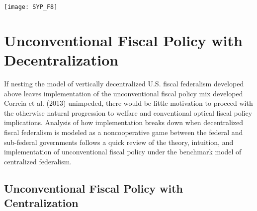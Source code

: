\documentclass[12pt,letterpaper]{article}
\begin{document}
\begin{center}
\texttt{[image: SYP\_F8]}
\end{center}

\section{Unconventional Fiscal Policy with Decentralization}

If nesting the model of vertically decentralized U.S. fiscal federalism developed above leaves implementation of the unconventional fiscal policy mix developed Correia et al. (2013) unimpeded, there would be little motivation to proceed with the otherwise natural progression to welfare and conventional optical fiscal policy implications. Analysis of how implementation breaks down when decentralized fiscal federalism is modeled as a noncooperative game between the federal and sub-federal governments follows a quick review of the theory, intuition, and implementation of unconventional fiscal policy under the benchmark model of centralized federalism. 

\subsection{Unconventional Fiscal Policy with Centralization}
\end{document}
